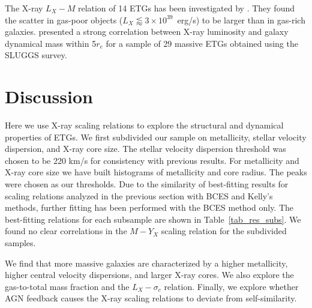 \documentclass[iop]{emulateapj}
\begin{document}
The X-ray $L_X-M$ relation of 14 ETGs has been investigated by \citet{Kim:13}. They found the scatter in gas-poor objects ($L_X \lessapprox 3\times 10^{39}$~erg/s) to be larger than in gas-rich galaxies. \citet{Forbes:16} presented a strong correlation between X-ray luminosity and galaxy dynamical mass within 5$r_e$ for a sample of 29 massive ETGs obtained using the SLUGGS survey. 


\section{Discussion}\label{sec_disc}

Here we use X-ray scaling relations to explore the structural and dynamical properties of ETGs. We first subdivided our sample on metallicity, stellar velocity dispersion, and X-ray core size. The stellar velocity dispersion threshold was chosen to be 220 km/s for consistency with previous results. For metallicity and X-ray core size we have built histograms of metallicity and core radius. The peaks were chosen as our thresholds. Due to the similarity of best-fitting results for scaling relations analyzed in the previous section with BCES and Kelly's methods, further fitting has been performed with the BCES method only. The best-fitting relations for each subsample are shown in Table~\ref{tab_res_subs}. We found no clear correlations in the $M - Y_X$ scaling relation for the subdivided samples.

We find that more massive galaxies are characterized by a higher metallicity, higher central velocity dispersions, and larger X-ray cores. We also explore the gas-to-total mass fraction and the $L_X-\sigma_c$ relation. Finally, we explore whether AGN feedback causes the X-ray scaling relations to deviate from self-similarity.
\end{document}
